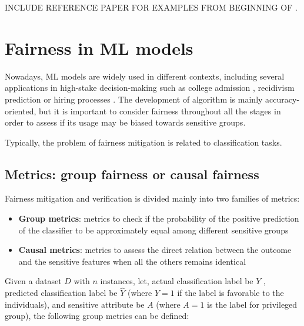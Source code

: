 \documentclass[12pt]{article}
\begin{document}
INCLUDE REFERENCE PAPER FOR EXAMPLES FROM BEGINNING OF \cite{pipeline}.

\vspace{0.5cm}

\section{Fairness in ML models}

Nowadays, ML models are widely used in different contexts, including several applications in high-stake decision-making such as college admission \cite{college}, recidivism prediction \cite{rec} or hiring processes \cite{hiring}. The development of algorithm is mainly accuracy-oriented, but it is important to consider fairness throughout all the stages in order to assess if its usage may be biased towards sensitive groups. 

Typically, the problem of fairness mitigation is related to classification tasks. 

\subsection{Metrics: group fairness or causal fairness}

Fairness mitigation and verification is divided mainly into two families of metrics:

\begin{itemize}
\item \textbf{Group metrics}: metrics to check if the probability of the positive prediction of the classifier to be approximately equal among different sensitive groups
\item \textbf{Causal metrics}: metrics to assess the direct relation between the outcome and the sensitive features when all the others remains identical
\end{itemize}

Given a dataset $D$ with $n$ instances, let, actual classification label be $Y$ , predicted classification label be $\hat{Y}$ (where $Y = 1$ if the label is favorable to the individuals), and sensitive attribute be $A$ (where $A=1$ is the label for privileged group), the following group metrics can be defined:
\end{document}
